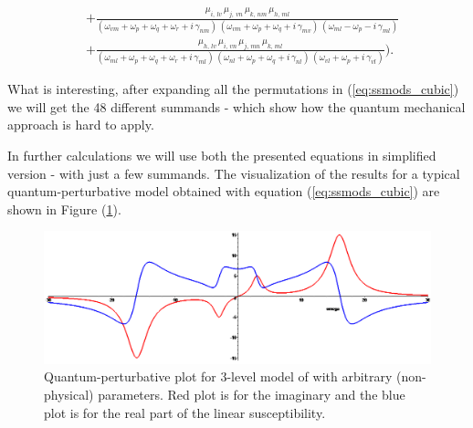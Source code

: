 \documentclass[12pt,twoside,a4paper]{article}
\numberwithin{equation}{subsection}
\numberwithin{figure}{subsection}
\begin{document}
\begin{equation}
\begin{split}
 \\ & + \frac {{\mu_{i,\,lv}}\,{\mu_{j,\,vn}}\,{\mu_{k,\,nm}}\,{\mu_{h,\,ml}}}
              {({\omega_{vm}} + {\omega_{p}} + {\omega_{q}} + {\omega_{r}} + i\,{\gamma_{nm}}) \,
               ({\omega_{vm}} + {\omega_{p}} + {\omega_{q}} + i\,{\gamma_{mv}}) \,
               ({\omega_{ml}} - {\omega_{p}} - i\,{\gamma_{ml}})} 
 \\ & + \frac {{\mu_{h, \,lv}}\,{\mu_{i,\,vn}}\,{\mu_{j,\,mn}}\,{\mu_{k,\,ml}}}
              {({\omega_{ml}} + {\omega_{p}} + {\omega_{q}} + {\omega_{r}} + i\,{\gamma_{ml}}) \,
               ({\omega_{nl}} + {\omega_{p}} + {\omega_{q}} + i\,{\gamma_{nl}}) \,
               ({\omega_{vl}} + {\omega_{p}} + i\,{\gamma_{vl}})}).
  \end{split}
\end{equation}


What is interesting, after expanding all the permutations in (\ref{eq:ssmods_cubic}) we will get the 48 different summands - which show how the quantum mechanical approach is hard to apply.

In further calculations we will use both the presented equations in simplified version - with just a few summands. The visualization of the results for a typical quantum-perturbative model obtained with equation (\ref{eq:ssmods_cubic}) are shown in Figure (\ref{fig:qp_plot}).

\begin{figure}
	\includegraphics[width=150mm]{img/qp_plot.png}
	\caption{Quantum-perturbative plot for 3-level model of with arbitrary (non-physical) parameters. Red plot is for the imaginary and the blue plot is for the real part of the linear susceptibility. \label{fig:qp_plot}}
\end{figure}
\end{document}
